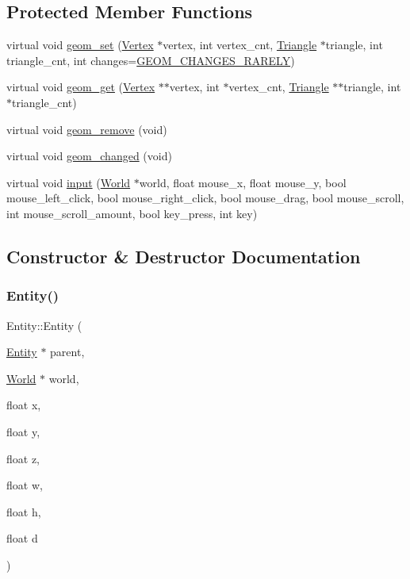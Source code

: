 \subsection*{Protected Member Functions}
\begin{DoxyCompactItemize}
\item 
virtual void \mbox{\hyperlink{classEntity_a9b71cfc90dee1d29b410649b43671fd5}{geom\+\_\+set}} (\mbox{\hyperlink{classVertex}{Vertex}} $\ast$vertex, int vertex\+\_\+cnt, \mbox{\hyperlink{classTriangle}{Triangle}} $\ast$triangle, int triangle\+\_\+cnt, int changes=\mbox{\hyperlink{World_8h_adf764cbdea00d65edcd07bb9953ad2b7afd62cb9ff74dd66a2597e9c31e205cba}{G\+E\+O\+M\+\_\+\+C\+H\+A\+N\+G\+E\+S\+\_\+\+R\+A\+R\+E\+LY}})
\item 
virtual void \mbox{\hyperlink{classEntity_a35b3384cb4aba28b3e2129d332499445}{geom\+\_\+get}} (\mbox{\hyperlink{classVertex}{Vertex}} $\ast$$\ast$vertex, int $\ast$vertex\+\_\+cnt, \mbox{\hyperlink{classTriangle}{Triangle}} $\ast$$\ast$triangle, int $\ast$triangle\+\_\+cnt)
\item 
virtual void \mbox{\hyperlink{classEntity_a078d35f6eac032312bf9aa1d5f8614c1}{geom\+\_\+remove}} (void)
\item 
virtual void \mbox{\hyperlink{classEntity_a6a98dc8aef878f984b942d6b8a57e968}{geom\+\_\+changed}} (void)
\item 
virtual void \mbox{\hyperlink{classEntity_a3a63eb809c17ebe620fa330cc59760df}{input}} (\mbox{\hyperlink{classWorld}{World}} $\ast$world, float mouse\+\_\+x, float mouse\+\_\+y, bool mouse\+\_\+left\+\_\+click, bool mouse\+\_\+right\+\_\+click, bool mouse\+\_\+drag, bool mouse\+\_\+scroll, int mouse\+\_\+scroll\+\_\+amount, bool key\+\_\+press, int key)
\end{DoxyCompactItemize}


\subsection{Constructor \& Destructor Documentation}
\mbox{\label{classEntity_a75afa73e0478e96c6ae96ab4428295a0}} 
\subsubsection{\texorpdfstring{Entity()}{Entity()}}
{\footnotesize\ttfamily Entity\+::\+Entity (\begin{DoxyParamCaption}\item[{\mbox{\hyperlink{classEntity}{Entity}} $\ast$}]{parent,  }\item[{\mbox{\hyperlink{classWorld}{World}} $\ast$}]{world,  }\item[{float}]{x,  }\item[{float}]{y,  }\item[{float}]{z,  }\item[{float}]{w,  }\item[{float}]{h,  }\item[{float}]{d }\end{DoxyParamCaption})}

